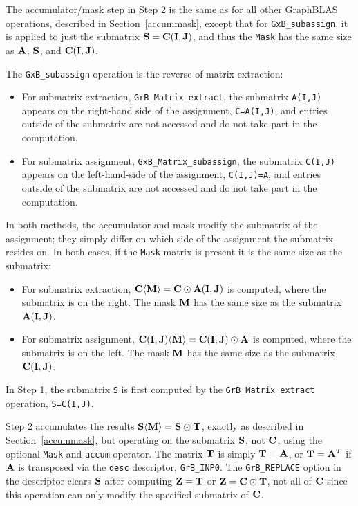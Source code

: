 \documentclass[12pt]{article}
\begin{document}
The accumulator/mask step in Step 2 is the same as for all other GraphBLAS
operations, described in Section~\ref{accummask}, except that for
\verb'GxB_subassign', it is applied to just the submatrix ${\bf S} = {\bf
C(I,J)}$, and thus the \verb'Mask' has the same size as ${\bf A}$,
${\bf S}$, and ${\bf C(I,J)}$.

The \verb'GxB_subassign' operation is the reverse of matrix extraction:

\begin{itemize}
\item
For submatrix extraction, \verb'GrB_Matrix_extract',
the submatrix \verb'A(I,J)' appears on the right-hand side of the assignment,
\verb'C=A(I,J)', and entries outside of the submatrix are not accessed and do
not take part in the computation.

\item
For submatrix assignment, \verb'GxB_Matrix_subassign',
the submatrix \verb'C(I,J)' appears on the left-hand-side of the assignment,
\verb'C(I,J)=A', and entries outside of the submatrix are not accessed and do
not take part in the computation.

\end{itemize}

In both methods, the accumulator and mask modify the submatrix of the
assignment; they simply differ on which side of the assignment the submatrix
resides on.  In both cases, if the \verb'Mask' matrix is present it is the same
size as the submatrix:

\begin{itemize}

\item
For submatrix extraction,
${\bf C \langle M \rangle = C \odot A(I,J)}$ is computed,
where the submatrix is on the right.
The mask ${\bf M}$ has the same size as the submatrix ${\bf A(I,J)}$.

\item
For submatrix assignment,
${\bf C(I,J) \langle M \rangle = C(I,J) \odot A}$ is computed,
where the submatrix is on the left.
The mask ${\bf M}$ has the same size as the submatrix ${\bf C(I,J)}$.

\end{itemize}

In Step 1, the submatrix \verb'S' is first computed by the
\verb'GrB_Matrix_extract' operation, \verb'S=C(I,J)'.

Step 2 accumulates the results ${\bf S \langle M \rangle  = S \odot T}$,
exactly as described in Section~\ref{accummask}, but operating on the submatrix
${\bf S}$, not ${\bf C}$, using the optional \verb'Mask' and \verb'accum'
operator.  The matrix ${\bf T}$ is simply ${\bf T}={\bf A}$, or ${\bf T}={\bf
A}^T$ if ${\bf A}$ is transposed via the \verb'desc' descriptor,
\verb'GrB_INP0'.  The \verb'GrB_REPLACE' option in the descriptor clears ${\bf
S}$ after computing ${\bf Z = T}$ or ${\bf Z = C \odot T}$, not all of ${\bf
C}$ since this operation can only modify the specified submatrix of ${\bf C}$.
\end{document}
